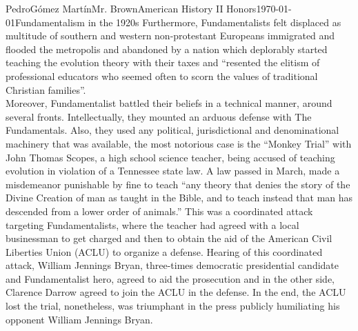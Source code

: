 \documentclass[12pt, letterpaper]{article}
\begin{document}
\begin{mla}{Pedro}{G\'{o}mez Mart\'{i}n}{Mr. Brown}{American History II Honors}{\today}{Fundamentalism in the 1920s}
  Furthermore, Fundamentalists felt displaced as multitude of southern and western non-protestant Europeans immigrated and flooded the metropolis and abandoned by a nation which deplorably started teaching the evolution theory with their taxes and “resented the elitism of professional educators who seemed often to scorn the values of traditional Christian families”.\parencite{RiseFundamentalism}\\
  Moreover, Fundamentalist battled their beliefs in a technical manner, around several fronts. Intellectually, they mounted an arduous defense with The Fundamentals. Also, they used any political, jurisdictional and denominational machinery that was available, the most notorious case is the “Monkey Trial” with John Thomas Scopes, a high school science teacher, being accused of teaching evolution in violation of a Tennessee state law. A law passed in March, made a misdemeanor punishable by fine to teach “any theory that denies the story of the Divine Creation of man as taught in the Bible, and to teach instead that man has descended from a lower order of animals.”\parencite{MonkeyTrial} This was a coordinated attack targeting Fundamentalists, where the teacher had agreed with a local businessman to get charged and then to obtain the aid of the American Civil Liberties Union (ACLU) to organize a defense. Hearing of this coordinated attack, William Jennings Bryan, three-times democratic presidential candidate and Fundamentalist hero, agreed to aid the prosecution and in the other side, Clarence Darrow agreed to join the ACLU in the defense. In the end, the ACLU lost the trial, nonetheless, was triumphant in the press publicly humiliating his opponent William Jennings Bryan.\\
\end{mla}
\printbibliography
\end{document}
